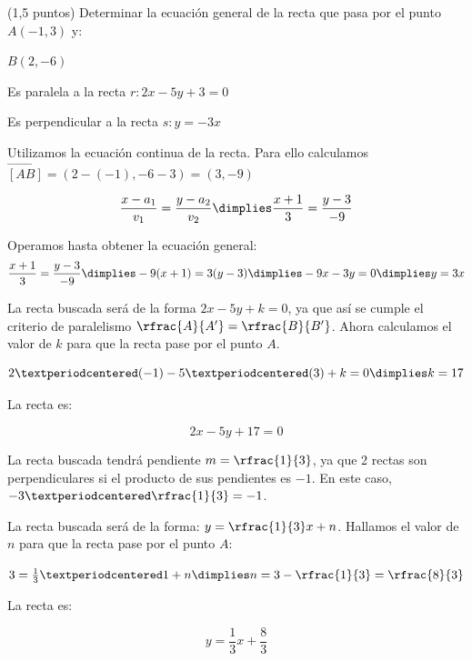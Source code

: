 \documentclass[palatino,nosec,nobuildate]{Docencia}
\begin{document}
\begin{problem}(1,5 puntos) Determinar la ecuación general de la recta que pasa por el punto $A(-1,3)$ y:

\ppart $B(2,-6)$

\ppart Es paralela a la recta $r:2x-5y+3=0$

\ppart Es perpendicular a la recta $s: y=-3x$

\solution

\spart Utilizamos la ecuación continua de la recta. Para ello calculamos $\vec{[AB]} = (2-(-1),-6-3) = (3,-9)$

\[
	\frac{x-a_1}{v_1} = \frac{y-a_2}{v_2} \dimplies \frac{x+1}{3} = \frac{y-3}{-9}
\]

Operamos hasta obtener la ecuación general:
\[
 \frac{x+1}{3} = \frac{y-3}{-9} \dimplies -9(x+1) = 3(y-3) \dimplies -9x-3y=0\dimplies y=3x
\]

\spart La recta buscada será de la forma $2x-5y+k=0$, ya que así se cumple el criterio de paralelismo $\rfrac{A}{A'} = \rfrac{B}{B'}$.
%
Ahora calculamos el valor de $k$ para que la recta pase por el punto $A$.

\[
	2·(-1) - 5·(3) + k = 0 \dimplies k = 17
\]

La recta es:

\[
	2x-5y+17=0
\]

\spart La recta buscada tendrá pendiente $m = \rfrac{1}{3}$, ya que 2 rectas son perpendiculares si el producto de sus pendientes es $-1$. En este caso, $-3·\rfrac{1}{3} = -1$.

La recta buscada será de la forma: $y=\rfrac{1}{3}x + n$. Hallamos el valor de $n$ para que la recta pase por el punto $A$:

$3 = \frac{1}{3}·1 + n \dimplies n=3-\rfrac{1}{3} = \rfrac{8}{3}$

La recta es:

\[
	y=\frac{1}{3}x+\frac{8}{3}
\]

\end{problem}
\end{document}
